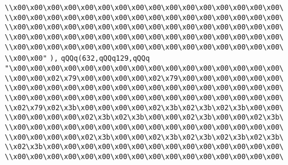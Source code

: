 \verb|\\x00\x00\x00\x00\x00\x00\x00\x00\x00\x00\x00\x00\x00\x00\x00\x00\|\newline
\verb|\\x00\x00\x00\x00\x00\x00\x00\x00\x00\x00\x00\x00\x00\x00\x00\x00\|\newline
\verb|\\x00\x00\x00\x00\x00\x00\x00\x00\x00\x00\x00\x00\x00\x00\x00\x00\|\newline
\verb|\\x00\x00\x00\x00\x00\x00\x00\x00\x00\x00\x00\x00\x00\x00\x00\x00\|\newline
\verb|\\x00\x00\x00\x00\x00\x00\x00\x00\x00\x00\x00\x00\x00\x00\x00\x00\|\newline
\verb|\\x00\x00"|\newline
\verb|),|\newline
\verb|qQQq(632,qQQq129,qQQq|\newline
\verb|"\x00\x00\x00\x00\x00\x00\x00\x00\x00\x00\x00\x00\x00\x00\x00\x00\|\newline
\verb|\\x00\x00\x02\x79\x00\x00\x00\x00\x02\x79\x00\x00\x00\x00\x00\x00\|\newline
\verb|\\x00\x00\x00\x00\x00\x00\x00\x00\x00\x00\x00\x00\x00\x00\x00\x00\|\newline
\verb|\\x00\x00\x00\x00\x00\x00\x00\x00\x00\x00\x00\x00\x00\x00\x00\x00\|\newline
\verb|\\x02\x79\x02\x3b\x00\x00\x00\x00\x02\x3b\x02\x3b\x02\x3b\x00\x00\|\newline
\verb|\\x00\x00\x00\x00\x02\x3b\x02\x3b\x00\x00\x02\x3b\x00\x00\x02\x3b\|\newline
\verb|\\x00\x00\x00\x00\x00\x00\x00\x00\x00\x00\x00\x00\x00\x00\x00\x00\|\newline
\verb|\\x00\x00\x00\x00\x02\x3b\x00\x00\x02\x3b\x02\x3b\x02\x3b\x02\x3b\|\newline
\verb|\\x02\x3b\x00\x00\x00\x00\x00\x00\x00\x00\x00\x00\x00\x00\x00\x00\|\newline
\verb|\\x00\x00\x00\x00\x00\x00\x00\x00\x00\x00\x00\x00\x00\x00\x00\x00\|\newline
